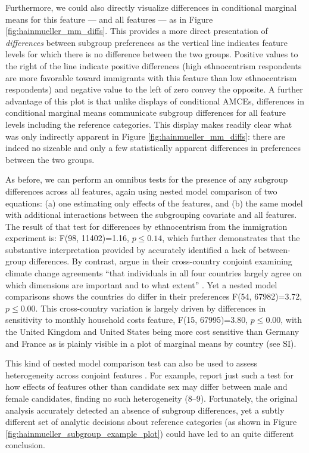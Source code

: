 \documentclass[a4paper,12pt]{article}\usepackage[]{graphicx}\usepackage[]{color}
\begin{document}
Furthermore, we could also directly visualize differences in conditional marginal means for this feature --- and all features --- as in Figure \ref{fig:hainmueller_mm_diffs}. This provides a more direct presentation of \textit{differences} between subgroup preferences as the vertical line indicates feature levels for which there is no difference between the two groups. Positive values to the right of the line indicate positive differences (high ethnocentrism respondents are more favorable toward immigrants with this feature than low ethnocentrism respondents) and negative value to the left of zero convey the opposite. A further advantage of this plot is that unlike displays of conditional AMCEs, differences in conditional marginal means communicate subgroup differences for all feature levels including the reference categories. This display makes readily clear what was only indirectly apparent in Figure \ref{fig:hainmueller_mm_diffs}: there are indeed no sizeable and only a few statistically apparent differences in preferences between the two groups.





As before, we can perform an omnibus tests for the presence of any subgroup differences across all features, again using nested model comparison of two equations: (a) one estimating only effects of the features, and (b) the same model with additional interactions between the subgrouping covariate and all features. The result of that test for differences by ethnocentrism from the immigration experiment is: F(98, 11402)=1.16, $p\leq0.14$, which further demonstrates that the substantive interpretation provided by \citet{HainmuellerHopkinsYamamoto2014} accurately identified a lack of between-group differences. By contrast, \citet{BechtelScheve2013} argue in their cross-country conjoint examining climate change agreements ``that individuals in all four countries largely agree on which dimensions are important and to what extent'' \citep[13765]{BechtelScheve2013}. Yet a nested model comparisons shows the countries do differ in their preferences F(54, 67982)=3.72, $p\leq0.00$. This cross-country variation is largely driven by differences in sensitivity to monthly household costs feature, F(15, 67995)=3.80, $p\leq0.00$, with the United Kingdom and United States being more cost sensitive than Germany and France as is plainly visible in a plot of marginal means by country (see SI).

This kind of nested model comparison test can also be used to assess heterogeneity across conjoint features \citep[see also][]{EgamiImai2018}. For example, \citet{TeeleKallaRosenbluth2018} report just such a test for how effects of features other than candidate sex may differ between male and female candidates, finding no such heterogeneity (8--9). Fortunately, the original analysis accurately detected an absence of subgroup differences, yet a subtly different set of analytic decisions about reference categories (as shown in Figure \ref{fig:hainmueller_subgroup_example_plot}) could have led to an quite different conclusion.
\end{document}
